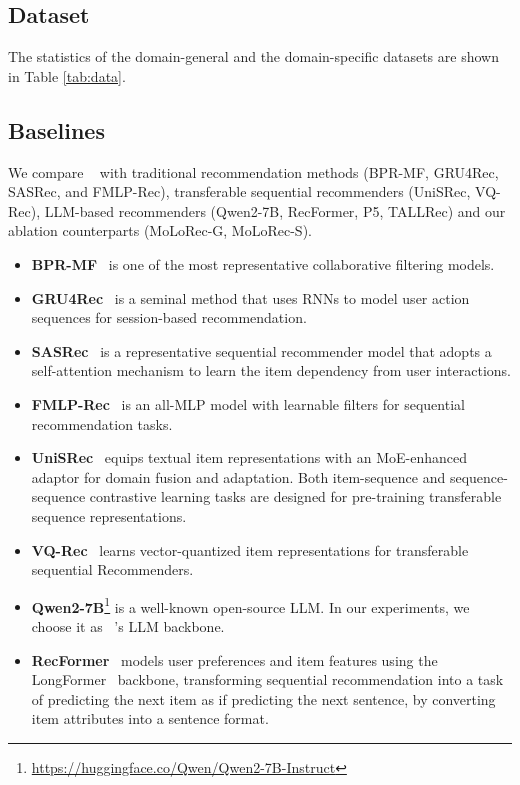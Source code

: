 \subsection{Dataset}
\label{sec:appendix_dataset}
The statistics of the domain-general and the domain-specific datasets are shown in Table \ref{tab:data}.
\subsection{Baselines}
\label{sec:appendix_baselines} 
We compare \shortname~ with traditional recommendation methods (BPR-MF, GRU4Rec, SASRec, and FMLP-Rec), transferable sequential recommenders (UniSRec, VQ-Rec), LLM-based recommenders (Qwen2-7B, RecFormer, P5, TALLRec) and our ablation counterparts (MoLoRec-G, MoLoRec-S). 
\begin{itemize}[leftmargin=*]
    \item \textbf{BPR-MF}~\cite{10.5555/1795114.1795167} is one of the most representative collaborative filtering models.
    \item \textbf{GRU4Rec}~\cite{DBLP:journals/corr/HidasiKBT15} is a seminal method that uses RNNs to model user action sequences for session-based recommendation. 
    \item \textbf{SASRec}~\cite{kang2018self} is a representative sequential recommender model that adopts a self-attention mechanism to learn the item dependency from user interactions.
    \item \textbf{FMLP-Rec}~\cite{10.1145/3485447.3512111} is an all-MLP model with learnable filters for sequential recommendation tasks.
    \item \textbf{UniSRec}~\cite{hou2022towards} equips textual item representations with an MoE-enhanced adaptor for domain fusion and adaptation. Both item-sequence and sequence-sequence contrastive learning tasks are designed for pre-training transferable sequence representations.
    \item \textbf{VQ-Rec}~\cite{10.1145/3543507.3583434} learns vector-quantized item representations for transferable sequential Recommenders.
    \item \textbf{Qwen2-7B}\footnote{\url{https://huggingface.co/Qwen/Qwen2-7B-Instruct}} is a well-known open-source LLM. In our experiments, we choose it as \shortname~'s LLM backbone.
    \item \textbf{RecFormer}~\cite{10.1145/3580305.3599519} models user preferences and item features using the LongFormer~\cite{beltagy2020longformer} backbone, transforming sequential recommendation into a task of predicting the next item as if predicting the next sentence, by converting item attributes into a sentence format.

\end{itemize}
